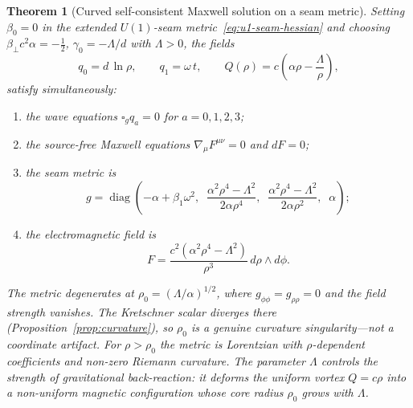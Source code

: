 \documentclass[pdflatex,sn-mathphys-num]{sn-jnl}
\theoremstyle{thmstyleone}%
\newtheorem{theorem}{Theorem}[section]
\theoremstyle{thmstyletwo}%
\theoremstyle{thmstylethree}%
\newcommand{\nn}{\nabla}
\numberwithin{equation}{section}
\begin{document}
\begin{theorem}[Curved self-consistent Maxwell
  solution on a seam metric]
\label{thm:curved-cyl}
Setting $\beta_0 = 0$ in the extended $U(1)$-seam
metric~\eqref{eq:u1-seam-hessian} and choosing
$\beta_\perp c^2 \alpha = -\tfrac{1}{2}$,
$\gamma_0 = -\Lambda/d$ with $\Lambda > 0$, the fields
\begin{equation}
\label{eq:curved-fields}
q_0 = d\,\ln\rho, \qquad
q_1 = \omega\,t, \qquad
Q(\rho) = c\!\left(\alpha\rho
  - \frac{\Lambda}{\rho}\right),
\end{equation}
satisfy simultaneously:
\begin{enumerate}[noitemsep,label=(\roman*)]
\item the wave equations $\square_g q_a = 0$ for
  $a = 0,1,2,3$;
\item the source-free Maxwell equations
  $\nn_\mu F^{\mu\nu} = 0$ and $dF = 0$;
\item the seam metric is
\begin{equation}
\label{eq:curved-metric}
g = \operatorname{diag}\!\left(
  -\alpha+\beta_1\omega^2,\;\;
  \frac{\alpha^2\rho^4 - \Lambda^2}{2\alpha\rho^4},\;\;
  \frac{\alpha^2\rho^4 - \Lambda^2}{2\alpha\rho^2},\;\;
  \alpha
\right);
\end{equation}
\item the electromagnetic field is
\begin{equation}
\label{eq:curved-F}
F = \frac{c^2(\alpha^2\rho^4 - \Lambda^2)}{\rho^3}\,
  d\rho\wedge d\phi.
\end{equation}
\end{enumerate}
The metric degenerates at
$\rho_0 = (\Lambda/\alpha)^{1/2}$, where
$g_{\phi\phi} = g_{\rho\rho} = 0$ and the field strength
vanishes.  The Kretschner scalar diverges there
(Proposition~\ref{prop:curvature}), so $\rho_0$ is a
genuine curvature singularity---not a coordinate
artifact.  For $\rho > \rho_0$ the metric is Lorentzian
with $\rho$-dependent coefficients and non-zero
Riemann curvature.  The parameter $\Lambda$ controls
the strength of gravitational back-reaction: it
deforms the uniform vortex $Q = c\rho$ into a
non-uniform magnetic configuration whose core radius
$\rho_0$ grows with $\Lambda$.
\end{theorem}
\end{document}

